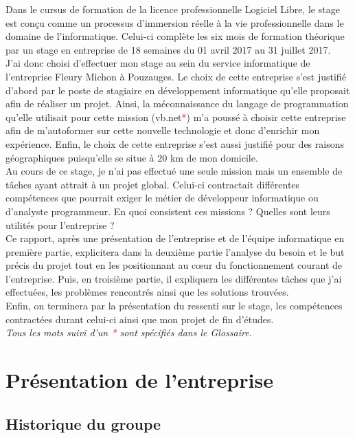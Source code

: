 \documentclass[a4paper,12pt]{extarticle}
\newcommand{\espaceInfo}{\vspace{6cm}}
\begin{document}
	Dans le cursus de formation de la licence professionnelle Logiciel Libre, le stage est conçu comme un processus d’immersion réelle à la vie professionnelle dans le domaine de l’informatique. Celui-ci complète les six mois de formation théorique par un stage en entreprise de 18 semaines du 01 avril 2017 au 31 juillet 2017.\\
J’ai donc choisi d’effectuer mon stage au sein du service informatique de l’entreprise Fleury Michon à Pouzauges. Le choix de cette entreprise s’est justifié d’abord par le poste de stagiaire en développement informatique qu’elle proposait afin de réaliser un projet. Ainsi, la méconnaissance du langage de programmation qu’elle utilisait pour cette mission (vb.net\textcolor{red}{*}) m’a poussé à choisir cette entreprise afin de m’autoformer sur cette nouvelle technologie et donc d'enrichir mon expérience. Enfin, le choix de cette entreprise s’est aussi justifié pour des raisons géographiques puisqu’elle se situe à 20 km de mon domicile.\\
Au cours de ce stage, je n’ai pas effectué une seule mission mais un ensemble de tâches ayant attrait à un projet global. Celui-ci contractait différentes compétences que pourrait exiger le métier de développeur informatique ou d’analyste programmeur. En quoi consistent ces missions ? Quelles sont leurs utilités pour l’entreprise ?\\
Ce rapport, après une présentation de l’entreprise et de l’équipe informatique en première partie, explicitera dans la deuxième partie l’analyse du besoin et le but précis du projet tout en les positionnant au cœur du fonctionnement courant de l’entreprise. Puis, en troisième partie, il expliquera les différentes tâches que j’ai effectuées, les problèmes rencontrés ainsi que les solutions trouvées.\\
Enfin, on terminera par la présentation du ressenti sur le stage, les compétences contractées durant celui-ci ainsi que mon projet de fin d’études.\\

\espaceInfo{}
\emph{Tous les mots suivi d'un \textcolor{red}{*} sont spécifiés dans le Glossaire.}

	\clearpage
	
	\section{Présentation de l’entreprise}
	
	\subsection{Historique du groupe}
\end{document}
